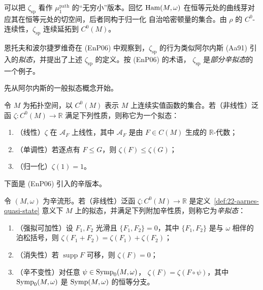 可以把 $\zeta_{\mathrm{sp}}$ 看作 $\mu_1^{\mathrm{path}}$ 的“无穷小”版本。回忆
$\operatorname{Ham}(M,\omega)$ 在恒等元处的曲线芽对应其在恒等元处的切空间，后者同构于归一化
自治哈密顿量的集合。由 $\rho$ 的 $C^0$-连续性，$\zeta_{\mathrm{sp}}$ 连续延拓到
$C^0(M)$。

恩托夫和波尔捷罗维奇在 (EnP06) 中观察到，$\zeta_{\mathrm{sp}}$ 的行为类似阿尔内斯
(Aa91) 引入的\emph{拟态}，并提出了上述 $\zeta_{\mathrm{sp}}$ 的定义。按 (EnP06) 的术语，
$\zeta_{\mathrm{sp}}$ 是\emph{部分辛拟态}的一个例子。

先从阿尔内斯的一般拟态概念开始。

\begin{definition}[阿尔内斯]
\label{def:22-aarnes-quasi-state}
令 $M$ 为拓扑空间，以 $C^0(M)$ 表示 $M$ 上连续实值函数的集合。若（非线性）泛函
$\zeta:C^0(M)\to\mathbb R$ 满足下列性质，则称它为一个拟态：
\begin{enumerate}[label=\arabic*.]
\item （线性）$\zeta$ 在 $\mathcal A_F$ 上线性，其中 $\mathcal A_F$ 是由
      $F\in C(M)$ 生成的 $\mathbb R$-代数；
\item （单调性）若逐点有 $F\leq G$，则 $\zeta(F)\leq\zeta(G)$；
\item （归一化）$\zeta(1)=1$。
\end{enumerate}
\end{definition}

下面是 (EnP06) 引入的辛版本。

\begin{definition}[恩托夫和波尔捷罗维奇]
\label{def:22-symplectic-quasi-state}
令 $(M,\omega)$ 为辛流形。若（非线性）泛函
$\zeta:C^0(M)\to\mathbb R$ 是定义~\ref{def:22-aarnes-quasi-state}
意义下 $M$ 上的拟态，并满足下列附加辛性质，则称它为\emph{辛拟态}：
\begin{enumerate}[label=\arabic*.,start=4]
\item （强拟可加性）设 $F_1,F_2$ 光滑且 $\{F_1,F_2\}=0$，其中
      $\{F_1,F_2\}$ 是与 $\omega$ 相伴的泊松括号，则
      $\zeta(F_1+F_2)=\zeta(F_1)+\zeta(F_2)$；
\item （消失性）若 $\operatorname{supp}F$ 可移，则 $\zeta(F)=0$；
\item （辛不变性）对任意 $\psi\in\operatorname{Symp}_0(M,\omega)$，
      $\zeta(F)=\zeta(F\circ\psi)$，其中 $\operatorname{Symp}_0(M,\omega)$ 是
      $\operatorname{Symp}(M,\omega)$ 的恒等分支。
\end{enumerate}
\end{definition}

